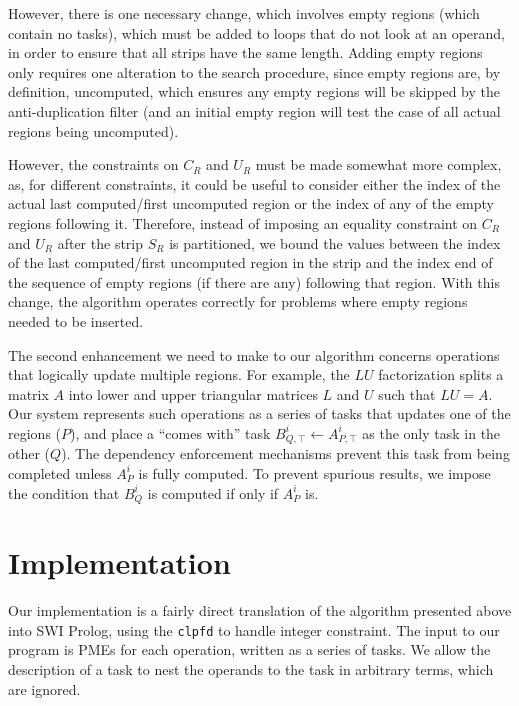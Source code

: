 \documentclass[12pt,letterpaper]{article}
\newcommand*{\opF}{\mathcal{F}}
\begin{document}
However, there is one necessary change, which involves empty regions (which contain no tasks), which must be added to loops that do not look at an operand, in order to ensure that all strips have the same length.
Adding empty regions only requires one alteration to the search procedure, since empty regions are, by definition, uncomputed, which ensures any empty regions will be skipped by the anti-duplication filter (and an initial empty region will test the case of all actual regions being uncomputed).

However, the constraints on $C_R$ and $U_R$ must be made somewhat more complex, as, for different constraints, it could be useful to consider either the index of the actual last computed/first uncomputed region or the index of any of the empty regions following it.
Therefore, instead of imposing an equality constraint on $C_R$ and $U_R$ after the strip $S_R$ is partitioned, we bound the values between the index of the last computed/first uncomputed region in the strip and the index end of the sequence of empty regions (if there are any) following that region.
With this change, the algorithm operates correctly for problems where empty regions needed to be inserted.

The second enhancement we need to make to our algorithm concerns operations that logically update multiple regions.
For example, the $LU$ factorization splits a matrix $A$ into lower and upper triangular matrices $L$ and $U$ such that $LU = A$.
Our system represents such operations as a series of tasks that updates one of the regions ($P$), and place a ``comes with'' task $B^i_{Q, \top} \leftarrow A^i_{P, \top}$ as the only task in the other ($Q$).
The dependency enforcement mechanisms prevent this task from being completed unless $A^i_P$ is fully computed.
To prevent spurious results, we impose the condition that $B^i_Q$ is computed if only if $A^i_P$ is.

\section{Implementation}
Our implementation is a fairly direct translation of the algorithm presented above into SWI Prolog, using the \texttt{clpfd} to handle integer constraint.
The input to our program is PMEs for each operation,  written as a series of tasks.
We allow the description of a task to nest the operands to the task in arbitrary terms, which are ignored.

\end{document}

